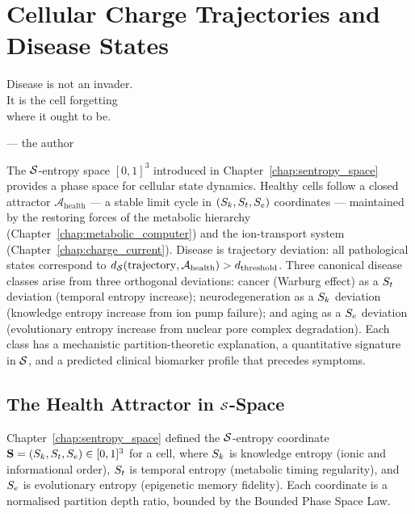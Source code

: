 
\chapter{Cellular Charge Trajectories and Disease States}
\label{chap:charge_trajectories}

\epigraph{%
  Disease is not an invader.\\
  It is the cell forgetting\\
  where it ought to be.%
}{--- the author}

\begin{chapterbox}
The $\mathcal{S}$-entropy space $[0,1]^3$ introduced in
Chapter~\ref{chap:sentropy_space} provides a phase space for cellular state
dynamics. Healthy cells follow a closed attractor $\mathcal{A}_{\mathrm{health}}$
--- a stable limit cycle in $(S_k, S_t, S_e)$ coordinates --- maintained by
the restoring forces of the metabolic hierarchy (Chapter~\ref{chap:metabolic_computer})
and the ion-transport system (Chapter~\ref{chap:charge_current}).
Disease is trajectory deviation: all pathological states correspond to
$d_{\mathcal{S}}(\mathrm{trajectory}, \mathcal{A}_{\mathrm{health}}) > d_{\mathrm{threshold}}$.
Three canonical disease classes arise from three orthogonal deviations:
cancer (Warburg effect) as a $S_t$ deviation (temporal entropy increase);
neurodegeneration as a $S_k$ deviation (knowledge entropy increase from ion
pump failure); and aging as a $S_e$ deviation (evolutionary entropy increase
from nuclear pore complex degradation). Each class has a mechanistic
partition-theoretic explanation, a quantitative signature in $\mathcal{S}$, and
a predicted clinical biomarker profile that precedes symptoms.
\end{chapterbox}

\section{The Health Attractor in \texorpdfstring{$\mathcal{S}$}{S}-Space}
\label{sec:health_attractor}

Chapter~\ref{chap:sentropy_space} defined the $\mathcal{S}$-entropy coordinate
$\mathbf{S} = (S_k, S_t, S_e) \in [0,1]^3$ for a cell, where $S_k$ is knowledge
entropy (ionic and informational order), $S_t$ is temporal entropy (metabolic
timing regularity), and $S_e$ is evolutionary entropy (epigenetic memory
fidelity). Each coordinate is a normalised partition depth ratio, bounded by
the Bounded Phase Space Law.

